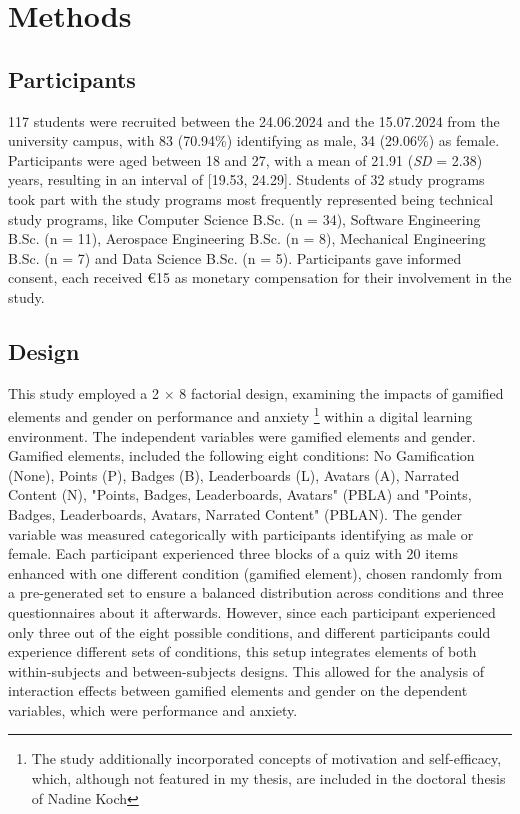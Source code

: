 \section{Methods}
\subsection{Participants}
117 students were recruited between the 24.06.2024 and the 15.07.2024 from the university campus, with 83 (70.94\%) identifying as male, 34 (29.06\%) as female.
Participants were aged between 18 and 27, with a mean of 21.91 (\textit{SD} = 2.38) years, resulting in an interval of [19.53, 24.29].
Students of 32 study programs took part with the study programs most frequently represented being technical study programs, like Computer Science B.Sc. (n = 34), Software Engineering B.Sc. (n = 11), Aerospace Engineering B.Sc. (n = 8), Mechanical Engineering B.Sc. (n = 7) and Data Science B.Sc. (n = 5).
Participants gave informed consent, each received €15 as monetary compensation for their involvement in the study.

\subsection{Design}
This study employed a 2 $\times$ 8 factorial design, examining the impacts of gamified elements and gender on performance and anxiety \footnote{The study additionally incorporated concepts of motivation and self-efficacy, which, although not featured in my thesis, are included in the doctoral thesis of Nadine Koch} within a digital learning environment.
The independent variables were gamified elements and gender.
Gamified elements, included the following eight conditions: No Gamification (None), Points (P), Badges (B), Leaderboards (L), Avatars (A), Narrated Content (N), "Points, Badges, Leaderboards, Avatars" (PBLA) and "Points, Badges, Leaderboards, Avatars, Narrated Content" (PBLAN).
The gender variable was measured categorically with participants identifying as male or female.
Each participant experienced three blocks of a quiz with 20 items enhanced with  one different condition (gamified element), chosen randomly from a pre-generated set to ensure a balanced distribution across conditions and three questionnaires about it afterwards.
However, since each participant experienced only three out of the eight possible conditions, and different participants could experience different sets of conditions, this setup integrates elements of both within-subjects and between-subjects designs.
This allowed for the analysis of interaction effects between gamified elements and gender on the dependent variables, which were performance and anxiety.

